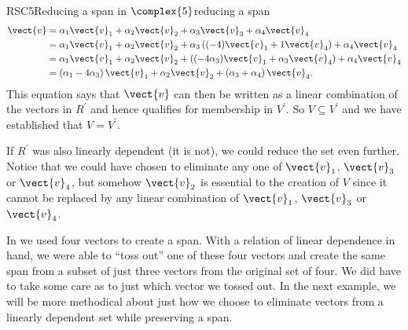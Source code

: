 \begin{example}{RSC5}{Reducing a span in $\complex{5}$}{reducing a span}
%
\begin{align*}
\vect{v}&=
%
\alpha_1\vect{v}_1+\alpha_2\vect{v}_2+\alpha_3\vect{v}_3+\alpha_4\vect{v}_4\\
%
&=\alpha_1\vect{v}_1+\alpha_2\vect{v}_2+
\alpha_3\left((-4)\vect{v}_1+1\vect{v}_4\right)+
\alpha_4\vect{v}_4\\
%
&=\alpha_1\vect{v}_1+\alpha_2\vect{v}_2+
\left((-4\alpha_3)\vect{v}_1+\alpha_3\vect{v}_4\right)+
\alpha_4\vect{v}_4\\
%
&=\left(\alpha_1-4\alpha_3\right)\vect{v}_1+
\alpha_2\vect{v}_2+
\left(\alpha_3+\alpha_4\right)\vect{v}_4.
\end{align*}
%
This equation says that $\vect{v}$ can then be written as a linear combination of the vectors in $R^\prime$ and hence qualifies for membership in $V^\prime$.  So $V\subseteq V^\prime$ and we have established that $V=V^\prime$.\par
%
If $R^\prime$ was also linearly dependent (it is not), we could reduce the set even further.  Notice that we could have chosen to eliminate any one of $\vect{v}_1$, $\vect{v}_3$ or $\vect{v}_4$, but somehow $\vect{v}_2$ is essential to the creation of $V$ since it cannot be replaced by any linear combination of $\vect{v}_1$, $\vect{v}_3$ or $\vect{v}_4$.
%
\end{example}
%
%
%
In  we used four vectors to create a span.  With a relation of linear dependence in hand, we were able to ``toss out'' one of these four vectors and create the same span from a subset of just three vectors from the original set of four.  We did have to take some care as to just which vector we tossed out.  In the next example, we will be more methodical about just how we choose to eliminate vectors from a linearly dependent set while preserving a span.
